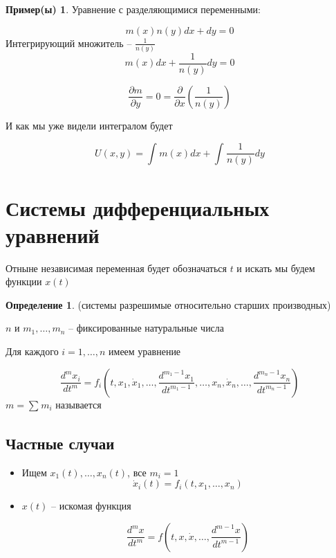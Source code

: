 \documentclass[a4paper]{article}
\theoremstyle{indented}
\theoremstyle{definition}
\newtheorem*{defn}{Определение}
\newtheorem*{exl}{Пример(ы)}
\theoremstyle{remark}
\begin{document}
\begin{exl}
  Уравнение с разделяющимися переменными:

  \[m(x)n(y) dx + dy = 0\]
  Интегрирующий множитель -- $\frac{1}{n(y)}$
  \[m(x)dx + \frac{1}{n(y)} dy = 0\]

  \[ \frac{\partial m}{\partial y} = 0 = \frac{\partial }{\partial x}(\frac{1}{n(y)})\]

  И как мы уже видели интегралом будет

  \[U(x,y) = \int_{}^{}m(x) dx + \int_{}^{}\frac{1}{n(y)} dy \]
\end{exl}
  
\section{Системы дифференциальных уравнений}

Отныне независимая переменная будет обозначаться $t$ и искать мы будем функции $x(t)$

\begin{defn}
   (системы разрешимые относительно старших производных)

  $n$ и $m_1, \ldots , m_n$ -- фиксированные натуральные числа

  Для каждого $i = 1,\ldots, n$ имеем уравнение

  \[\frac{d^mx_i}{dt^m} = f_i(t,x_1, \dot x_1, \ldots, \frac{d^{m_1-1}x_1}{dt^{m_1-1}}, \ldots , x_n, \dot x_n, \ldots, \frac{d^{m_n-1}x_n}{dt^{m_n-1}})  \]
  $m = \sum_{}^{}m_i$ называется 
\end{defn}

\subsection{Частные случаи}

\begin{itemize}
\item {}
  Ищем $x_1(t), \ldots, x_n(t)$, все $m_i = 1$
  \begin{equation*}
      \dot x_i(t) = f_i(t,x_1, \ldots ,x_n)
  \end{equation*}


\item {}
  $x(t)$ -- искомая функция

  \[\frac{d^mx}{dt^m} = f(t,x, \dot x, \ldots, \frac{d^{m-1}x}{dt^{m-1}})\]
\end{itemize}
\end{document}
